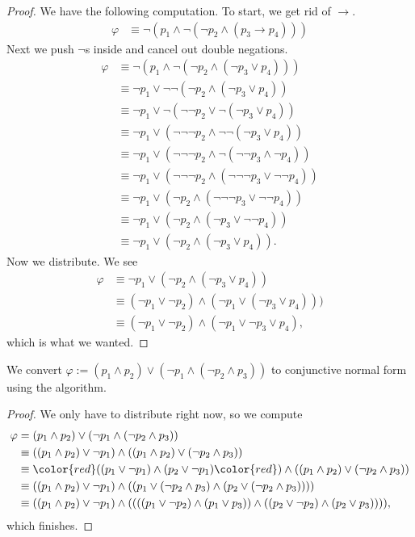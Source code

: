 \begin{proof}
	We have the following computation. To start, we get rid of $\to$.
	\begin{align*}
		\varphi &\equiv\lnot(p_1\land\lnot(\lnot p_2\land(p_3\to p_4)))
	\end{align*}
	Next we push $\lnot$s inside and cancel out double negations.
	\begin{align*}
		\varphi &\equiv\lnot(p_1\land\lnot(\lnot p_2\land(\lnot p_3\lor p_4))) \\
		&\equiv\lnot p_1\lor\lnot\lnot(\lnot p_2\land(\lnot p_3\lor p_4)) \\
		&\equiv\lnot p_1\lor\lnot(\lnot\lnot p_2\lor\lnot(\lnot p_3\lor p_4)) \\
		&\equiv\lnot p_1\lor(\lnot\lnot\lnot p_2\land\lnot\lnot(\lnot p_3\lor p_4)) \\
		&\equiv\lnot p_1\lor(\lnot\lnot\lnot p_2\land\lnot(\lnot\lnot p_3\land \lnot p_4)) \\
		&\equiv\lnot p_1\lor(\lnot\lnot\lnot p_2\land(\lnot\lnot\lnot p_3\lor \lnot\lnot p_4)) \\
		&\equiv\lnot p_1\lor(\lnot p_2\land(\lnot\lnot\lnot p_3\lor \lnot\lnot p_4)) \\
		&\equiv\lnot p_1\lor(\lnot p_2\land(\lnot p_3\lor \lnot\lnot p_4)) \\
		&\equiv\lnot p_1\lor(\lnot p_2\land(\lnot p_3\lor p_4)).
	\end{align*}
	Now we distribute. We see
	\begin{align*}
		\varphi & \equiv\lnot p_1\lor(\lnot p_2\land(\lnot p_3\lor p_4)) \\
		& \equiv(\lnot p_1\lor\lnot p_2)\land(\lnot p_1\lor(\lnot p_3\lor p_4))) \\
		& \equiv\boxed{(\lnot p_1\lor\lnot p_2)\land(\lnot p_1\lor\lnot p_3\lor p_4)},
	\end{align*}
	which is what we wanted.
\end{proof}
\begin{exe}
	We convert $\varphi:=(p_1\land p_2)\lor(\lnot p_1\land(\lnot p_2\land p_3))$ to conjunctive normal form using the algorithm.
\end{exe}
\begin{proof}
	We only have to distribute right now, so we compute
	\begin{align*}
		\varphi &= (p_1\land p_2)\lor(\lnot p_1\land(\lnot p_2\land p_3)) \\
		&\equiv ((p_1\land p_2)\lor\lnot p_1)\land((p_1\land p_2)\lor(\lnot p_2\land p_3)) \\
		&\equiv {\color{red}(}(p_1\lor\lnot p_1)\land(p_2\lor\lnot p_1){\color{red})}\land((p_1\land p_2)\lor(\lnot p_2\land p_3)) \\
		&\equiv ((p_1\land p_2)\lor\lnot p_1)\land((p_1\lor(\lnot p_2\land p_3)\land( p_2\lor(\lnot p_2\land p_3)))) \\
		&\equiv ((p_1\land p_2)\lor\lnot p_1)\land((((p_1\lor\lnot p_2)\land (p_1\lor p_3))\land( (p_2\lor\lnot p_2)\land(p_2\lor p_3)))),
	\end{align*}
	which finishes.
\end{proof}